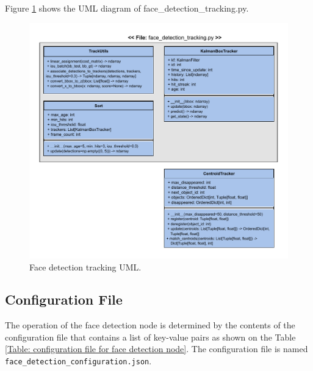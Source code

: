 \documentclass{CSSRforAfrica}
\begin{document}
{\newpage

Figure \ref{fig: Face detection tracking UML} shows the UML diagram of face\_detection\_tracking.py.

\begin{figure}[!hbpt]
	\centering
	\includegraphics[scale=0.90]{images/Face_Tracking_UML.pdf}
	\caption{Face detection tracking UML.}
	\label{fig: Face detection tracking UML}
\end{figure}

\newpage

\subsection*{Configuration File}
The operation of the face detection node is determined by the contents of the configuration file that contains a list of key-value pairs as shown on the Table \ref{Table: configuration file for face detection node}.
The configuration file is named  \\
\texttt{face\_detection\_configuration.json}. 

}
\end{document}
